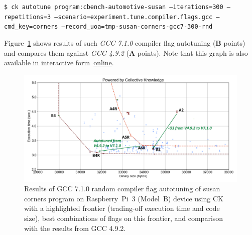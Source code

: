 \begin{flushleft}
\texttt{\$ ck autotune program:cbench-automotive-susan --iterations=300 --repetitions=3 
  --scenario=experiment.tune.compiler.flags.gcc
  --cmd\_key=corners --record\_uoa=tmp-susan-corners-gcc7-300-rnd}
\end{flushleft}

Figure~\ref{fig:autotuning-susan-gcc7} shows results of such \textit{GCC 7.1.0}
compiler flag autotuning (\textbf{B} points) and compares them 
against \textit{GCC 4.9.2} (\textbf{A} points).
%
Note that this graph is also available in interactive form~\href{http://cknowledge.org/repo/web.php?wcid=graph:96fd8e4c8394b1bc&subgraph=rpi3-autotuning-susan-gcc7-interactive}{online}.

   \begin{figure}[]
     \centering
      \includegraphics[width=6.9in]
      {ck-assets/9e4b1594d3b99443-cropped.pdf} %
      \vspace{0.1in}
      \vspace{0.1in}
     \caption{
      Results of GCC 7.1.0 random compiler flag autotuning of susan corners program on Raspberry~Pi~3 (Model~B) 
      device using CK with a highlighted frontier (trading-off execution time and code size), 
      best combinations of flags on this frontier, and comparison with the results from GCC 4.9.2.
     }
     \label{fig:autotuning-susan-gcc7}
   \end{figure}

